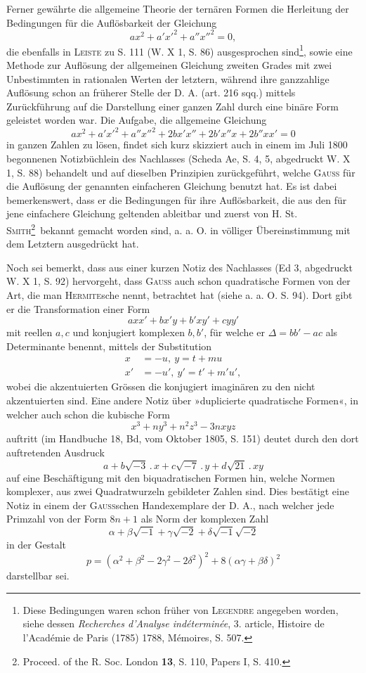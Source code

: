 Ferner gewährte die allgemeine Theorie der ternären Formen die Herleitung der Bedingungen für die Auflösbarkeit der Gleichung
\[
ax^2+a'x'^2+a''x''^2=0,
\]
die ebenfalls in \textsc{Leiste} zu S. 111 (W. X 1, S. 86) ausgesprochen sind\footnote{Diese Bedingungen waren schon früher von \textsc{Legendre} angegeben worden, siehe dessen \textit{Recherches d’Analyse indéterminée}, 3. article, Histoire de l’Académie de Paris (1785) 1788, Mémoires, S. 507.}, sowie eine Methode zur Auflösung der allgemeinen Gleichung zweiten Grades mit zwei Unbestimmten in rationalen Werten der letztern, während ihre ganzzahlige Auflösung schon an früherer Stelle der D. A. (art. 216 sqq.) mittels Zurückführung auf die Darstellung einer ganzen Zahl durch eine binäre Form geleistet worden war. Die Aufgabe, die allgemeine Gleichung
\[
ax^2+a'x'^2+a''x''^2+2bx'x''+2b'x''x+2b''xx'=0
\]
\newpage{}
\noindent in ganzen Zahlen zu lösen, findet sich kurz skizziert auch in einem im Juli 1800 begonnenen Notizbüchlein des Nachlasses (Scheda Ae, S. 4, 5, abgedruckt W. X 1, S. 88) behandelt und auf dieselben Prinzipien zurückgeführt, welche \textsc{Gauss} für die Auflösung der genannten einfacheren Gleichung benutzt hat. Es ist dabei bemerkenswert, dass er die Bedingungen für ihre Auflösbarkeit, die aus den für jene einfachere Gleichung geltenden ableitbar und zuerst von H. St. \textsc{Smith}\footnote{Proceed. of the R. Soc. London \textbf{13}, S. 110, Papers I, S. 410.}\ bekannt gemacht worden sind, a. a. O. in völliger Übereinstimmung mit dem Letztern ausgedrückt hat.

Noch sei bemerkt, dass aus einer kurzen Notiz des Nachlasses (Ed 3, abgedruckt W. X 1, S. 92) hervorgeht, dass \textsc{Gauss} auch schon quadratische Formen von der Art, die man \textsc{Hermite}sche nennt, betrachtet hat (siehe a. a. O. S. 94). Dort gibt er die Transformation einer Form
\[
axx'+bx'y+b'xy'+cyy'
\]
mit reellen \(a,c\) und konjugiert komplexen \(b,b'\), für welche er \(\Delta=bb'-ac\) als Determinante benennt, mittels der Substitution
\[
\begin{aligned}
x&=-u,\ y=t+mu\\
x'&=-u',\ y'=t'+m'u',
\end{aligned}
\]
wobei die akzentuierten Grössen die konjugiert imaginären zu den nicht akzentuierten sind. Eine andere Notiz über »duplicierte quadratische Formen«, in welcher auch schon die kubische Form
\[
x^3+ny^3+n^2z^3-3nxyz
\]
auftritt (im Handbuche 18, Bd, vom Oktober 1805, S. 151) deutet durch den dort auftretenden Ausdruck
\[
a+b\sqrt{-3}\mathbin{.}x+c\sqrt{-7}\mathbin{.}y+d\sqrt{21}\mathbin{.}xy
\]
auf eine Beschäftigung mit den biquadratischen Formen hin, welche Normen komplexer, aus zwei Quadratwurzeln gebildeter Zahlen sind. Dies bestätigt eine Notiz in einem der \textsc{Gauss}schen Handexemplare der D. A., nach welcher jede Primzahl von der Form \(8n+1\) als Norm der komplexen Zahl
\newpage{}
\[
\alpha+\beta\sqrt{-1}+\gamma\sqrt{-2}+\delta\sqrt{-1}\sqrt{-2}
\]
in der Gestalt
\[
p=(\alpha^2+\beta^2-2\gamma^2-2\delta^2)^2+8(\alpha\gamma+\beta\delta)^2
\]
darstellbar sei.

